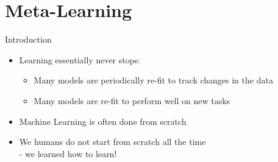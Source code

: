 \section{Meta-Learning}
\begin{frame}[c]{Introduction}


\begin{itemize}
	\item Learning essentially never stops:
	\begin{itemize}
		\item Many models are periodically re-fit to track changes in the data
		\item Many models are re-fit to perform well on new tasks
	\end{itemize}
	
    \item Machine Learning is often done from scratch
    
    \item We humans do not start from scratch all the time \\ - we learned how to learn!
\end{itemize}

\end{frame}

	


